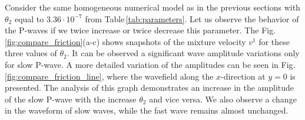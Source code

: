 \documentclass[3p,times,table]{article}
\begin{document}
Consider the same homogeneous numerical model as in the previous sections with 
$ \theta_2$ equal to $3.36\cdot10^{-7}$ from Table\,\ref{tab:parameters}. Let 
us observe the behavior of the  P-waves if we twice increase or twice decrease 
this parameter. The Fig.\,\ref{fig:compare_friction}(a-c) shows snapshots of 
the mixture velocity $v^1$ for these three values of $ \theta_2$. It can be 
observed a significant wave amplitude variations only for slow P-wave. A more 
detailed variation of the amplitudes can be seen in 
Fig.\,\ref{fig:compare_friction_line}, where the wavefield along the 
$x$-direction 
at $y=0$ is presented. The analysis of this graph demonstrates an increase in 
the 
amplitude of  the slow P-wave with the increase $\theta_2$ 
and vice versa. We also observe a change in the waveform of slow waves, while 
the fast wave remains almost unchanged.
\end{document}
